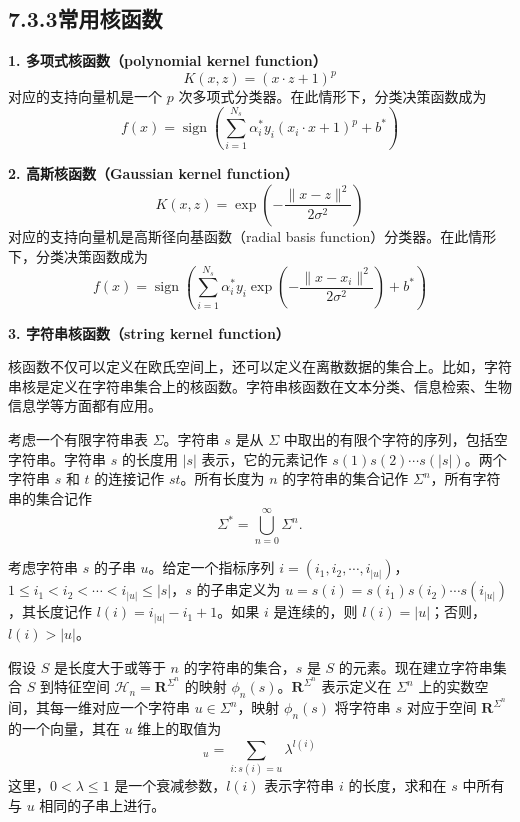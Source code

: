 \documentclass[UTF8,12pt,a4paper,fontset=fandol]{ctexart}
\begin{document}
\subsection*{7.3.3\quad 常用核函数}

\noindent\textbf{1. 多项式核函数（polynomial kernel function）}
\begin{equation}
K(x,z)=(x\cdot z+1)^p
\tag{7.88}
\end{equation}
对应的支持向量机是一个 $p$ 次多项式分类器。在此情形下，分类决策函数成为
\begin{equation}
f(x)=\operatorname{sign}\left(\sum_{i=1}^{N_s}\alpha_i^*y_i(x_i\cdot x+1)^p+b^*\right)
\tag{7.89}
\end{equation}

\noindent\textbf{2. 高斯核函数（Gaussian kernel function）}
\begin{equation}
K(x,z)=\exp\left(-\frac{\|x-z\|^2}{2\sigma^2}\right)
\tag{7.90}
\end{equation}
对应的支持向量机是高斯径向基函数（radial basis function）分类器。在此情形下，分类决策函数成为
\begin{equation}
f(x)=\operatorname{sign}\left(\sum_{i=1}^{N_s}\alpha_i^*y_i\exp\left(-\frac{\|x-x_i\|^2}{2\sigma^2}\right)+b^*\right)
\tag{7.91}
\end{equation}

\noindent\textbf{3. 字符串核函数（string kernel function）}

核函数不仅可以定义在欧氏空间上，还可以定义在离散数据的集合上。比如，字符串核是定义在字符串集合上的核函数。字符串核函数在文本分类、信息检索、生物信息学等方面都有应用。

考虑一个有限字符串表 $\Sigma$。字符串 $s$ 是从 $\Sigma$ 中取出的有限个字符的序列，包括空字符串。字符串 $s$ 的长度用 $|s|$ 表示，它的元素记作 $s(1)s(2)\cdots s(|s|)$。两个字符串 $s$ 和 $t$ 的连接记作 $st$。所有长度为 $n$ 的字符串的集合记作 $\Sigma^n$，所有字符串的集合记作
\[
\Sigma^*=\bigcup_{n=0}^{\infty}\Sigma^n.
\]

考虑字符串 $s$ 的子串 $u$。给定一个指标序列 $i=(i_1,i_2,\cdots,i_{|u|})$，$1\leq i_1<i_2<\cdots<i_{|u|}\leq |s|$，$s$ 的子串定义为 $u=s(i)=s(i_1)s(i_2)\cdots s(i_{|u|})$，其长度记作 $l(i)=i_{|u|}-i_1+1$。如果 $i$ 是连续的，则 $l(i)=|u|$；否则，$l(i)>|u|$。

假设 $S$ 是长度大于或等于 $n$ 的字符串的集合，$s$ 是 $S$ 的元素。现在建立字符串集合 $S$ 到特征空间 $\mathcal{H}_n=\mathbf{R}^{\Sigma^n}$ 的映射 $\phi_n(s)$。$\mathbf{R}^{\Sigma^n}$ 表示定义在 $\Sigma^n$ 上的实数空间，其每一维对应一个字符串 $u\in\Sigma^n$，映射 $\phi_n(s)$ 将字符串 $s$ 对应于空间 $\mathbf{R}^{\Sigma^n}$ 的一个向量，其在 $u$ 维上的取值为
\begin{equation}
[\phi_n(s)]_u=\sum_{i:s(i)=u}\lambda^{l(i)}
\tag{7.92}
\end{equation}
这里，$0<\lambda\leq 1$ 是一个衰减参数，$l(i)$ 表示字符串 $i$ 的长度，求和在 $s$ 中所有与 $u$ 相同的子串上进行。
\end{document}

